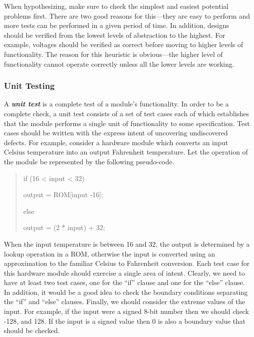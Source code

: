When hypothesizing, make sure to check the simplest and easiest
potential problems first. There are two good reasons for this---they are
easy to perform and more tests can be performed in a given period of
time. In addition, designs should be verified from the lowest levels of
abstraction to the highest. For example, voltages should be verified as
correct before moving to higher levels of functionality. The reason for
this heuristic is obvious---the higher level of functionality cannot
operate correctly unless all the lower levels are working.

\subsubsection{Unit Testing}\label{unit-testing}

A \emph{\textbf{unit test}} is a complete test of a module's
functionality. In order to be a complete check, a unit test consists of
a set of test cases each of which establishes that the module performs a
single unit of functionality to some specification. Test cases should be
written with the express intent of uncovering undiscovered defects. For
example, consider a hardware module which converts an input Celsius
temperature into an output Fahrenheit temperature. Let the operation of
the module be represented by the following pseudo-code.

\begin{quote}
if (16 \textless{} input \textless{} 32)

output = ROM{[}input -16{]};

else

output = (2 * input) + 32;
\end{quote}

When the input temperature is between 16 and 32, the output is
determined by a lookup operation in a ROM, otherwise the input is
converted using an approximation to the familiar Celsius to Fahrenheit
conversion. Each test case for this hardware module should exercise a
single area of intent. Clearly, we need to have at least two test cases,
one for the ``if'' clause and one for the ``else'' clause. In addition,
it would be a good idea to check the boundary conditions separating the
``if'' and ``else'' clauses. Finally, we should consider the extreme
values of the input. For example, if the input were a signed 8-bit
number then we should check -128, and 128. If the input is a signed
value then 0 is also a boundary value that should be checked.


